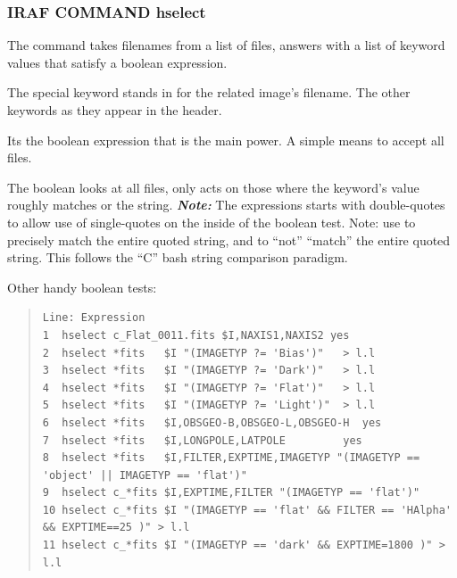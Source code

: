 \subsubsection{IRAF COMMAND hselect}

The {\color{verbcolor}{\verb#hselect#}} command takes filenames from
a list of files, answers with a list of keyword values that satisfy a
boolean expression.

\begin{quote}
{\color{verbcolor}{\verb#hselect filelist Comma-Keyword-List boolean#}}
\end{quote}

The special keyword {\color{verbcolor}{\verb#$I#}} stands in for the
related image's filename. The other keywords as they appear in the header.

Its the boolean expression that is the main power. A simple
{\color{verbcolor}{\verb#yes#}} means to accept all files.

The boolean {\color{verbcolor}{\verb#"(IMAGETYP ?= 'Bias')"#}} looks
at all files, only acts on those where the {\color{verbcolor}{\verb#IMAGETYP#}}
keyword's value roughly matches or {\color{verbcolor}{\verb#looks like (?=)#}}
the string. \textbf{\emph{Note:}} The expressions starts with double-quotes to allow
use of single-quotes on the inside of the boolean test. Note: use {\color{verbcolor}{\verb#==#}}
to precisely match the entire quoted string, and {\color{verbcolor}{\verb#!=#}} to
``not'' ``match'' the entire quoted string. This follows the ``C'' bash string comparison
paradigm.

Other handy boolean tests:

\begin{quote}
\begingroup \fontsize{10pt}{10pt}
\selectfont
\begin{verbatim}
Line: Expression
1  hselect c_Flat_0011.fits $I,NAXIS1,NAXIS2 yes
2  hselect *fits   $I "(IMAGETYP ?= 'Bias')"   > l.l
3  hselect *fits   $I "(IMAGETYP ?= 'Dark')"   > l.l
4  hselect *fits   $I "(IMAGETYP ?= 'Flat')"   > l.l
5  hselect *fits   $I "(IMAGETYP ?= 'Light')"  > l.l
6  hselect *fits   $I,OBSGEO-B,OBSGEO-L,OBSGEO-H  yes
7  hselect *fits   $I,LONGPOLE,LATPOLE         yes
8  hselect *fits   $I,FILTER,EXPTIME,IMAGETYP "(IMAGETYP == 'object' || IMAGETYP == 'flat')"
9  hselect c_*fits $I,EXPTIME,FILTER "(IMAGETYP == 'flat')"
10 hselect c_*fits $I "(IMAGETYP == 'flat' && FILTER == 'HAlpha' && EXPTIME==25 )" > l.l
11 hselect c_*fits $I "(IMAGETYP == 'dark' && EXPTIME=1800 )" > l.l
\end{verbatim}
\endgroup
\end{quote}

